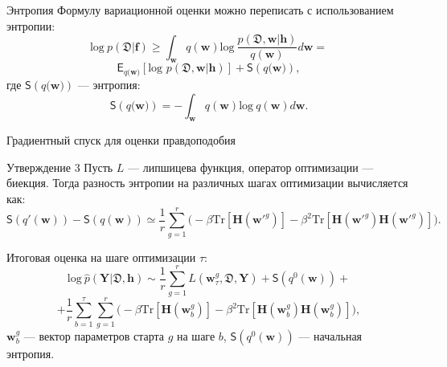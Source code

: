 \documentclass[usenames,dvipsnames,10pt,pdf,utf8,russian,aspectratio=43]{beamer}
\begin{document}
\begin{frame}{Энтропия}
Формулу вариационной оценки можно переписать с использованием энтропии:
$$\text{log}~p(\mathfrak{D}|\mathbf{f}) \geq 
\int_{\mathbf{w}} q(\mathbf{w})\text{log}~\frac{p(\mathfrak{D},\mathbf{w}|\mathbf{h})}{q(\mathbf{w})}d\mathbf{w} = 
$$
$$
\mathsf{E}_{q(\mathbf{w)}}[\text{log~}p (\mathfrak{D}, \mathbf{w}| \mathbf{h})] + \mathsf{S}({q(\mathbf{w)}}),
$$
где $\mathsf{S}({q(\mathbf{w)}})$ --- энтропия:
$$
\mathsf{S}({q(\mathbf{w)}}) = - \int_{\mathbf{w}} q(\mathbf{w})\text{log}~q(\mathbf{w})d\mathbf{w}.  	
$$
\end{frame}


\begin{frame}{Градиентный спуск для оценки правдоподобия}
\begin{block}{Утверждение 3}
Пусть $L$ --- липшицева функция, оператор оптимизации --- биекция.
Тогда разность энтропии на различных шагах оптимизации вычисляется как:
\[
\mathsf{S}(q'(\mathbf{w})) -  \mathsf{S}(q(\mathbf{w}))  \simeq  \frac{1}{r}\sum_{g=1}^r \bigl(-\beta \text{Tr}[\mathbf{H}(\mathbf{w}'^g)] - \beta^2 \text{Tr}[\mathbf{H}(\mathbf{w}'^g)\mathbf{H}(\mathbf{w}'^g)]  \bigr).
\]
\end{block}

Итоговая оценка на шаге оптимизации $\tau$:
$$
\text{log}~\hat{p}(\mathbf{Y}|\mathfrak{D}, \mathbf{h}) \sim \frac{1}{r} \sum_{g = 1}^r L(\mathbf{w}^g_\tau, \mathfrak{D}, \mathbf{Y})  + \mathsf{S}(q^0(\mathbf{w}))+$$ $$ + \frac{1}{r}\sum_{b=1}^\tau\sum_{g=1}^r \bigl(-\beta \text{Tr}[\mathbf{H}(\mathbf{w}_b^g)] - \beta^2 \text{Tr}[\mathbf{H}(\mathbf{w}_b^g)\mathbf{H}(\mathbf{w}_b^g)]  \bigr),
$$
$\mathbf{w}_b^g$ --- вектор параметров старта $g$ на шаге $b$, $\mathsf{S}(q^0(\mathbf{w}))$ --- начальная энтропия.
\end{frame}
\end{document}

